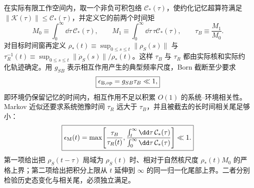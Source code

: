 在实际有限工作空间内，取一个非负可积包络 $\mathcal C_*(\tau)$，使约化记忆超算符满足
$\|\mathcal K(\tau)\|\le\mathcal C_*(\tau)$，并定义它的前两个时间矩
\[
M_0\equiv\int_0^\infty\dd\tau\,\mathcal C_*(\tau),
\qquad
M_1\equiv\int_0^\infty\dd\tau\,\tau\mathcal C_*(\tau),
\qquad
\tau_B\equiv\frac{M_1}{M_0}.
\]
对目标时间窗再定义
$\rho_*(t)\equiv\sup_{0\le s\le t}\|\rho_S(s)\|$ 与
$\tau_R^{-1}(t)\equiv\sup_{0\le s\le t}\|\dot\rho_S(s)\|/\rho_*(t)$。这样 $\tau_B$ 与 $\tau_R$ 都由实际核和实际约化轨迹确定。用 $g_{SB}$ 表示相互作用产生的典型频率尺度，Born 截断至少要求
\begin{equation}
\boxed{
\epsilon_{\rm B,op}=g_{SB}\tau_B\ll1,}
\label{eq:open_system_born_control_parameter}
\end{equation}
即环境仍保留记忆的时间内，相互作用不足以积累 $O(1)$ 的系统--环境相关性。Markov 近似还要求系统弛豫时间 $\tau_R$ 远大于 $\tau_B$，并且被截去的长时间相关尾足够小：
\begin{equation}
\boxed{
\epsilon_{\rm M}(t)
=\max\!\left[
\frac{\tau_B}{\tau_R(t)},
\frac{\int_t^\infty\dd\tau\,\mathcal C_*(\tau)}
{\int_0^\infty\dd\tau\,\mathcal C_*(\tau)}
\right]\ll1.}
\label{eq:markov_timescale_control_parameter}
\end{equation}
第一项给出把 $\rho_S(t-\tau)$ 局域为 $\rho_S(t)$ 时、相对于自然核尺度 $\rho_*(t)M_0$ 的严格上界；第二项给出把积分上限从 $t$ 延伸到 $\infty$ 的同一归一化尾部上界。二者分别检验历史态变化与相关尾，必须独立满足。


